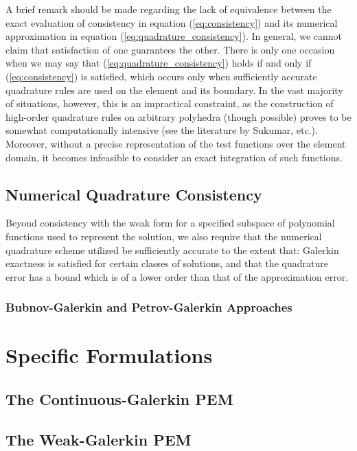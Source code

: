 A brief remark should be made regarding the lack of equivalence between the exact evaluation of consistency in equation (\ref{eq:consistency}) and its numerical approximation in equation (\ref{eq:quadrature_consistency}). In general, we cannot claim that satisfaction of one guarantees the other. There is only one occasion when we may say that (\ref{eq:quadrature_consistency}) holds if and only if (\ref{eq:consistency}) is satisfied, which occurs only when sufficiently accurate quadrature rules are used on the element and its boundary. In the vast majority of situations, however, this is an impractical constraint, as the construction of high-order quadrature rules on arbitrary polyhedra (though possible) proves to be somewhat computationally intensive (see the literature by Sukumar, etc.). Moreover, without a precise representation of the test functions over the element domain, it becomes infeasible to consider an exact integration of such functions.

\subsection{Numerical Quadrature Consistency}

Beyond consistency with the weak form for a specified subspace of polynomial functions used to represent the solution, we also require that the numerical quadrature scheme utilized be sufficiently accurate to the extent that: Galerkin exactness is satisfied for certain classes of solutions, and that the quadrature error has a bound which is of a lower order than that of the approximation error.

\subsubsection{Bubnov-Galerkin and Petrov-Galerkin Approaches}

\section{Specific Formulations}

\subsection{The Continuous-Galerkin PEM}


\subsection{The Weak-Galerkin PEM}

